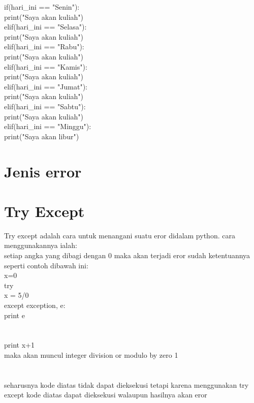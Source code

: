\begin{enumerate}
if(hari\_ini == "Senin"):\\
    print("Saya akan kuliah")\\
elif(hari\_ini == "Selasa"):\\
    print("Saya akan kuliah")\\
elif(hari\_ini == "Rabu"):\\
    print("Saya akan kuliah")\\
elif(hari\_ini == "Kamis"):\\
    print("Saya akan kuliah")\\
elif(hari\_ini == "Jumat"):\\
    print("Saya akan kuliah")\\
elif(hari\_ini == "Sabtu"):\\
    print("Saya akan kuliah")\\
elif(hari\_ini == "Minggu"):\\
    print("Saya akan libur")\\
\end{enumerate}

\section*{Jenis error}
\section*{Try Except}
\par
Try except adalah cara untuk menangani suatu eror didalam python. cara menggunakannya ialah:\\
setiap angka yang dibagi dengan 0 maka akan terjadi eror sudah ketentuannya seperti contoh dibawah ini:\\
x=0\\
try\\
x = 5/0\\

except exception, e:\\
print e\\
\\
\\
print x+1\\
maka akan muncul integer division or modulo by zero 1\\
\\
\\
seharusnya kode diatas tidak dapat dieksekusi tetapi karena menggunakan try except kode diatas dapat dieksekusi walaupun hasilnya akan eror